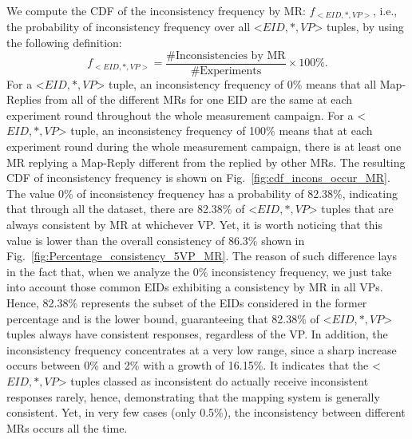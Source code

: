 We compute the CDF of the inconsistency frequency by MR: $f_{<EID, *, VP>}$, i.e.,  the probability of inconsistency frequency over all <$EID, *, VP$> tuples, by using the following definition: 
\begin{equation}
f_{<EID, *, VP>}= \frac{\text{\# Inconsistencies by MR}}{\text{\# Experiments}}\times100\%.
\end{equation}
For a <$EID, *, VP$> tuple, an inconsistency frequency of 0\% means that all Map-Replies from all of the different MRs for one EID are the same at each experiment round throughout the whole measurement campaign.  For a <$EID, *, VP$> tuple, an inconsistency frequency of 100\% means that at each experiment round during the whole measurement campaign, there is at least one MR replying a Map-Reply different from the replied by other MRs. The resulting CDF of inconsistency frequency is shown on Fig.~\ref{fig:cdf_incons_occur_MR}. The value 0\% of inconsistency frequency has a probability of 82.38\%, indicating that through all the dataset, there are 82.38\% of <$EID, *, VP$> tuples that are always consistent by MR at whichever VP. Yet, it is worth noticing that this value is lower than the overall consistency of 86.3\% shown in Fig.~\ref{fig:Percentage_consistency_5VP_MR}. The reason of such difference lays in the fact that, when we analyze the 0\% inconsistency frequency, we just take into account those common EIDs exhibiting a consistency by MR in all VPs. Hence, 82.38\% represents the subset of the EIDs considered in the former percentage and is the lower bound, guaranteeing that 82.38\% of <$EID, *, VP$> tuples always have consistent responses, regardless of the VP. In addition, the inconsistency frequency concentrates at a very low range, since a sharp increase occurs between 0\% and 2\% with a growth of 16.15\%. %
It indicates that the <$EID, *, VP$> tuples classed as inconsistent do actually receive inconsistent responses rarely, hence, demonstrating that the mapping system is generally consistent. Yet, in very few cases (only 0.5\%), the inconsistency between different MRs occurs all the time.

